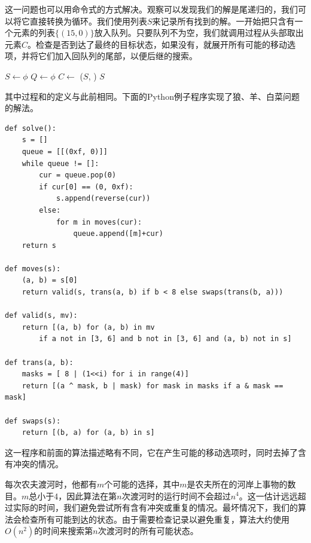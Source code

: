 \documentclass[b5paper]{ctexart}
\begin{document}
这一问题也可以用命令式的方式解决。观察可以发现我们的解是尾递归的，我们可以将它直接转换为循环。我们使用列表$S$来记录所有找到的解。一开始把只含有一个元素的列表$\{(15, 0)\}$放入队列。只要队列不为空，我们就调用过程从头部取出元素$C$。检查是否到达了最终的目标状态，如果没有，就展开所有可能的移动选项，并将它们加入回队列的尾部，以便后继的搜索。

\begin{algorithmic}[1]
  \State $S \gets \phi$
  \State $Q \gets \phi$
  \State {}
    \State $C \gets $ 
      \State {}($S$, )
    \Else
          \State {}
        \EndIf
      \EndFor
    \EndIf
  \EndWhile
  \State \Return $S$
\EndFunction
\end{algorithmic}

其中过程和的定义与此前相同。下面的Python例子程序实现了狼、羊、白菜问题的解法。

\lstset{language=Python}
\begin{lstlisting}
def solve():
    s = []
    queue = [[(0xf, 0)]]
    while queue != []:
        cur = queue.pop(0)
        if cur[0] == (0, 0xf):
            s.append(reverse(cur))
        else:
            for m in moves(cur):
                queue.append([m]+cur)
    return s

def moves(s):
    (a, b) = s[0]
    return valid(s, trans(a, b) if b < 8 else swaps(trans(b, a)))

def valid(s, mv):
    return [(a, b) for (a, b) in mv
        if a not in [3, 6] and b not in [3, 6] and (a, b) not in s]

def trans(a, b):
    masks = [ 8 | (1<<i) for i in range(4)]
    return [(a ^ mask, b | mask) for mask in masks if a & mask == mask]

def swaps(s):
    return [(b, a) for (a, b) in s]
\end{lstlisting}

这一程序和前面的算法描述略有不同，它在产生可能的移动选项时，同时去掉了含有冲突的情况。

每次农夫渡河时，他都有$m$个可能的选择，其中$m$是农夫所在的河岸上事物的数目。$m$总小于4，因此算法在第$n$次渡河时的运行时间不会超过$n^4$。这一估计远远超过实际的时间，我们避免尝试所有含有冲突或重复的情况。最坏情况下，我们的算法会检查所有可能到达的状态。由于需要检查记录以避免重复，算法大约使用$O(n^2)$的时间来搜索第$n$次渡河时的所有可能状态。
\end{document}
